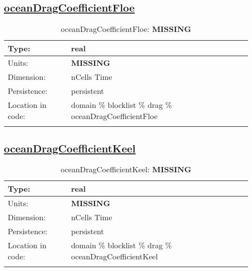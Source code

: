 \subsection[oceanDragCoefficientFloe]{\hyperref[sec:var_tab_drag]{oceanDragCoefficientFloe}}
\label{subsec:var_sec_drag_oceanDragCoefficientFloe}
\begin{center}
\begin{longtable}{| p{2.0in} | p{4.0in} |}
        \hline 
        Type: & real \\
        \hline 
        Units: & {\bf \color{red} MISSING} \\
        \hline 
        Dimension: & nCells Time \\
        \hline 
        Persistence: & persistent \\
        \hline 
         Location in code: & domain \% blocklist \% drag \% oceanDragCoefficientFloe \\
         \hline 
    \caption{oceanDragCoefficientFloe: {\bf \color{red} MISSING}}
\end{longtable}
\end{center}
\subsection[oceanDragCoefficientKeel]{\hyperref[sec:var_tab_drag]{oceanDragCoefficientKeel}}
\label{subsec:var_sec_drag_oceanDragCoefficientKeel}
\begin{center}
\begin{longtable}{| p{2.0in} | p{4.0in} |}
        \hline 
        Type: & real \\
        \hline 
        Units: & {\bf \color{red} MISSING} \\
        \hline 
        Dimension: & nCells Time \\
        \hline 
        Persistence: & persistent \\
        \hline 
         Location in code: & domain \% blocklist \% drag \% oceanDragCoefficientKeel \\
         \hline 
    \caption{oceanDragCoefficientKeel: {\bf \color{red} MISSING}}
\end{longtable}
\end{center}
